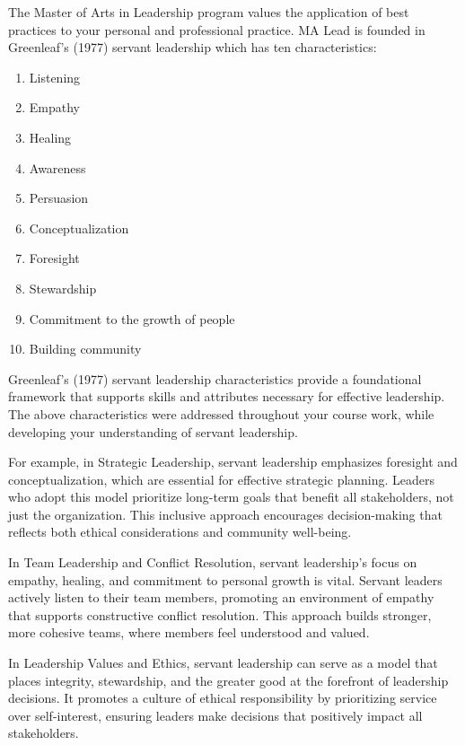 \documentclass[
  letterpaper,
  DIV=11,
  numbers=noendperiod]{scrreprt}
\providecommand{\tightlist}{%
  \setlength{\itemsep}{0pt}\setlength{\parskip}{0pt}}\usepackage{longtable,booktabs,array}
\begin{document}

The Master of Arts in Leadership program values the application of best
practices to your personal and professional practice. MA Lead is founded
in Greenleaf's (1977) servant leadership which has ten characteristics:

\begin{enumerate}
\def\labelenumi{\arabic{enumi}.}
\tightlist
\item
  Listening
\item
  Empathy
\item
  Healing
\item
  Awareness
\item
  Persuasion
\item
  Conceptualization
\item
  Foresight
\item
  Stewardship
\item
  Commitment to the growth of people
\item
  Building community
\end{enumerate}

Greenleaf's (1977) servant leadership characteristics provide a
foundational framework that supports skills and attributes necessary for
effective leadership. The above characteristics were addressed
throughout your course work, while developing your understanding of
servant leadership.

For example, in Strategic Leadership, servant leadership emphasizes
foresight and conceptualization, which are essential for effective
strategic planning. Leaders who adopt this model prioritize long-term
goals that benefit all stakeholders, not just the organization. This
inclusive approach encourages decision-making that reflects both ethical
considerations and community well-being.

In Team Leadership and Conflict Resolution, servant leadership's focus
on empathy, healing, and commitment to personal growth is vital. Servant
leaders actively listen to their team members, promoting an environment
of empathy that supports constructive conflict resolution. This approach
builds stronger, more cohesive teams, where members feel understood and
valued.

In Leadership Values and Ethics, servant leadership can serve as a model
that places integrity, stewardship, and the greater good at the
forefront of leadership decisions. It promotes a culture of ethical
responsibility by prioritizing service over self-interest, ensuring
leaders make decisions that positively impact all stakeholders.
\end{document}
